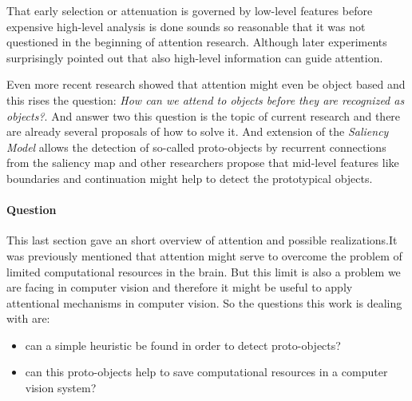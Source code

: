 That early selection or attenuation is governed by low-level features before expensive high-level analysis is done sounds so reasonable that it was not questioned in the beginning of attention research. Although later experiments surprisingly pointed out that also high-level information can guide attention.

Even more recent research \cite{Einhauser:2008cv} showed that attention might even be object based and this rises the question: \emph{How can we attend to objects before they are recognized as objects?}. And answer two this question is the topic of current research and there are already several proposals of how to solve it. And extension of the \emph{Saliency Model}  allows the detection of so-called proto-objects by recurrent connections from the saliency map  and other researchers propose  that mid-level features like boundaries and continuation might help to detect the prototypical objects.


\paragraph{Question} %
\label{par:question}
This last section gave an short overview of attention and possible realizations.It was previously mentioned that attention might serve to overcome the problem of limited computational resources in the brain. But this limit is also a problem we are facing in computer vision and therefore it might be useful to apply attentional mechanisms in computer vision. So the questions this work is dealing with are:

\begin{itemize}
    \item can a simple heuristic be found in order to detect proto-objects?
    \item can this proto-objects help to save computational resources in a computer vision system?
\end{itemize}

